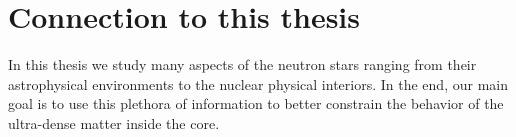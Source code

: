 %


\section{Connection to this thesis}
In this thesis we study many aspects of the neutron stars ranging from their astrophysical environments to the nuclear physical interiors.
In the end, our main goal is to use this plethora of information to better constrain the behavior of the ultra-dense matter inside the core.




